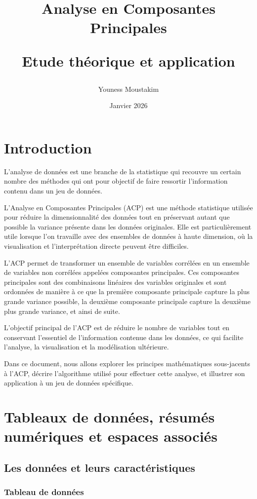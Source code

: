\documentclass[12pt,a4paper]{article}
\title{Analyse en Composantes Principales 

Etude théorique et application}
\author{Youness Moustakim}
\date{Janvier 2026}
\begin{document}
\maketitle

\section{Introduction}

L'analyse de données est une branche de la statistique qui recouvre un certain nombre des méthodes qui ont pour objectif de faire ressortir l'information contenu dans un jeu de données.

L'Analyse en Composantes Principales (ACP) est une méthode statistique utilisée pour réduire la dimensionnalité des données tout en préservant autant que possible la variance présente dans les données originales. Elle est particulièrement utile lorsque l'on travaille avec des ensembles de données à haute dimension, où la visualisation et l'interprétation directe peuvent être difficiles.

L'ACP permet de transformer un ensemble de variables corrélées en un ensemble de variables non corrélées appelées composantes principales. Ces composantes principales sont des combinaisons linéaires des variables originales et sont ordonnées de manière à ce que la première composante principale capture la plus grande variance possible, la deuxième composante principale capture la deuxième plus grande variance, et ainsi de suite.

L'objectif principal de l'ACP est de réduire le nombre de variables tout en conservant l'essentiel de l'information contenue dans les données, ce qui facilite l'analyse, la visualisation et la modélisation ultérieure.

Dans ce document, nous allons explorer les principes mathématiques sous-jacents à l'ACP, décrire l'algorithme utilisé pour effectuer cette analyse, et illustrer son application à un jeu de données spécifique.

\section{Tableaux de données, résumés numériques et espaces associés}

\subsection{Les données et leurs caractéristiques}
\subsubsection{Tableau de données}
\end{document}
